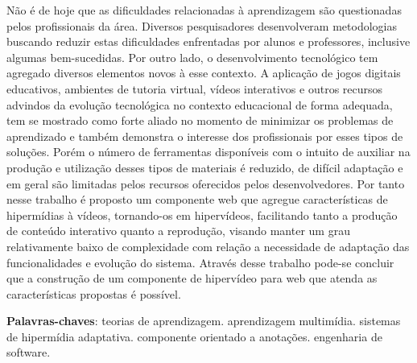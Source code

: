 \begin{resumo}
Não é de hoje que as dificuldades relacionadas à aprendizagem são questionadas pelos profissionais da área. Diversos pesquisadores desenvolveram metodologias buscando reduzir estas dificuldades enfrentadas por alunos e professores, inclusive algumas bem-sucedidas. Por outro lado, o desenvolvimento tecnológico tem agregado diversos elementos novos à esse contexto. A aplicação de jogos digitais educativos, ambientes de tutoria virtual, vídeos interativos e outros recursos advindos da evolução tecnológica no contexto educacional de forma adequada, tem se mostrado como forte aliado no momento de minimizar os problemas de aprendizado e também demonstra o interesse dos profissionais por esses tipos de soluções. Porém o número de ferramentas disponíveis com o intuito de auxiliar na produção e utilização desses tipos de materiais é reduzido, de difícil adaptação e em geral são limitadas pelos recursos oferecidos pelos desenvolvedores. Por tanto nesse trabalho é proposto um componente web que agregue  características de hipermídias à vídeos, tornando-os em hipervídeos, facilitando tanto a produção de conteúdo interativo quanto a reprodução, visando manter um grau relativamente baixo de complexidade com relação a necessidade de adaptação das funcionalidades e evolução do sistema. Através desse trabalho pode-se concluir que a construção de um componente de hipervídeo para web que atenda as características propostas é possível.
 \vspace{\onelineskip}
    
 \noindent
 \textbf{Palavras-chaves}: teorias de aprendizagem. aprendizagem multimídia. sistemas de hipermídia adaptativa. componente orientado a anotações. engenharia de software.
\end{resumo}
